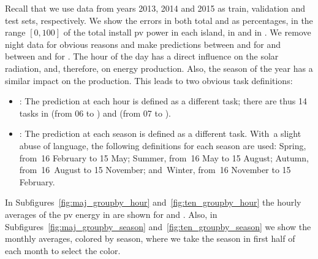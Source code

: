%
Recall that we use data from years 2013, 2014 and 2015 as train, validation and test sets, respectively.
%
We show the errors in both total \mwhu{} and as percentages, in the range $[0, 100]$ of the total install \acrshort{pv} power in each island, {} in  and  in .
%
We remove night data for obvious reasons and make predictions between  and  {for}  and between  and  for .
%
The hour of the day has a direct influence on the solar radiation, and, therefore, on energy production. Also, the season of the year has a similar impact on the production. This leads to two obvious task definitions:
\begin{itemize}
    \item	{}: The prediction at each hour is defined as a different task; there are thus 14 tasks in  (from 06 to ) and  (from 07 to ).
    \item	{}: The prediction at each season is defined as a different task.  With~a slight abuse of language, the following definitions for each season are used: Spring, from~16 February to 15 May; Summer, from~16 May to 15 August; Autumn, from~16~August to 15 November; and~Winter, from~16 November to 15 February.
\end{itemize}
%
In Subfigures~\ref{fig:maj_groupby_hour} and~\ref{fig:ten_groupby_hour} the hourly averages of the \acrshort{pv} energy in \mwhu{} are shown for  and .
Also, in Subfigures~\ref{fig:maj_groupby_season} and~\ref{fig:ten_groupby_season} we show the monthly averages, colored by season, where we take the season in first half of each month to select the color.

 





